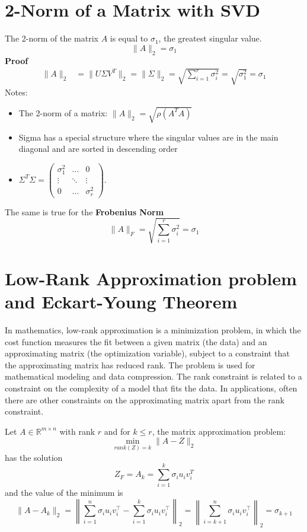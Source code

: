 \section{2-Norm of a Matrix with SVD}
The 2-norm of the matrix $A$ is equal to $\sigma_1$, the greatest singular value.
\[
\|A\|_2 = \sigma_1
\]
\textbf{Proof}
\[
\begin{aligned}
\|A\|_2 &= \|U\Sigma V^T\|_2 = \|\Sigma\|_2 = \sqrt{\sum_{i=1}^r \sigma_i^2} = \sqrt{\sigma_1^2} = \sigma_1
\end{aligned}
\]
Notes:
\begin{itemize}
    \item The 2-norm of a matrix: $\|A\|_2 = \sqrt{\rho(A^TA)}$
    \item Sigma has a special structure where the singular values are in the main diagonal and are sorted in descending order
    \item $\Sigma^T\Sigma = \begin{pmatrix}
        \sigma_1^2 & \ldots & 0 \\
        \vdots & \ddots & \vdots \\
        0 & \ldots & \sigma_r^2
        \end{pmatrix}$.
\end{itemize}

The same is true for the \textbf{Frobenius Norm}
\[
\|A\|_F = \sqrt{\sum_{i=1}^r \sigma_i^2} = \sigma_1
\]

\section{Low-Rank Approximation problem and Eckart-Young Theorem}
In mathematics, low-rank approximation is a minimization problem, in which the cost function measures
the fit between a given matrix (the data) and an approximating matrix (the optimization variable),
subject to a constraint that the approximating matrix has reduced rank. The problem is used for mathematical
modeling and data compression. The rank constraint is related to a constraint on the complexity of a model that
fits the data. In applications, often there are other constraints on the approximating matrix apart from the rank constraint.

Let $A \in \mathbb{R}^{m \times n}$ with rank $r$ and for $k \leq r$, the matrix approximation problem:
\[
\min_{rank(Z)=k} \|A-Z\|_2
\]
has the solution $$Z_F = A_k = \sum_{i=1}^k \sigma_i u_i v_i^T$$ and the value of the minimum is
\[
    \|A-A_{k}\|_{2}=\left\|\sum _{i=1}^{n}\sigma _{i}u_{i}v_{i}^{\top }-\sum _{i=1}^{k}\sigma _{i}u_{i}v_{i}^{\top }\right\|_{2}=\left\|\sum _{i=k+1}^{n}\sigma _{i}u_{i}v_{i}^{\top }\right\|_{2}=\sigma _{k+1}
\]

